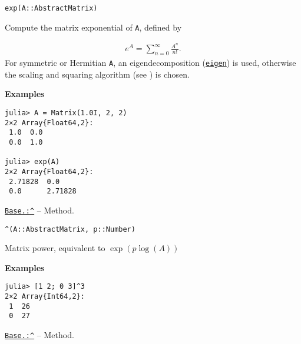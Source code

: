 \begin{adjustwidth}{2em}{0pt}


\begin{verbatim}
exp(A::AbstractMatrix)
\end{verbatim}

Compute the matrix exponential of \texttt{A}, defined by

\begin{equation*}
\begin{split}e^A = \sum_{n=0}^{\infty} \frac{A^n}{n!}.\end{split}\end{equation*}
For symmetric or Hermitian \texttt{A}, an eigendecomposition (\hyperlink{11056016707394839114}{\texttt{eigen}}) is used, otherwise the scaling and squaring algorithm (see \footnotemark[8]) is chosen.

\textbf{Examples}


\begin{verbatim}
julia> A = Matrix(1.0I, 2, 2)
2×2 Array{Float64,2}:
 1.0  0.0
 0.0  1.0

julia> exp(A)
2×2 Array{Float64,2}:
 2.71828  0.0
 0.0      2.71828
\end{verbatim}



\end{adjustwidth}
\hypertarget{13815303599818670515}{} 
\hyperlink{13815303599818670515}{\texttt{Base.:{\textasciicircum}}}  -- {Method.}

\begin{adjustwidth}{2em}{0pt}


\begin{verbatim}
^(A::AbstractMatrix, p::Number)
\end{verbatim}

Matrix power, equivalent to  \(\exp(p\log(A))\) 

\textbf{Examples}


\begin{verbatim}
julia> [1 2; 0 3]^3
2×2 Array{Int64,2}:
 1  26
 0  27
\end{verbatim}



\end{adjustwidth}
\hypertarget{7435396726429142215}{} 
\hyperlink{7435396726429142215}{\texttt{Base.:{\textasciicircum}}}  -- {Method.}

